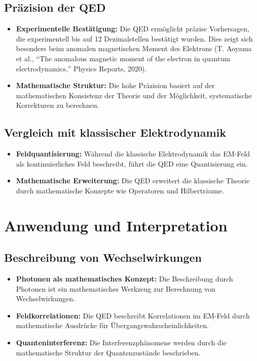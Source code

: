 \documentclass[12pt,a4paper]{article}
\begin{document}
	\subsection{Präzision der QED}
	\begin{itemize}
		\item \textbf{Experimentelle Bestätigung:} Die QED ermöglicht präzise Vorhersagen, die experimentell bis auf 12 Dezimalstellen bestätigt wurden. Dies zeigt sich besonders beim anomalen magnetischen Moment des Elektrons (T. Aoyama et al., ``The anomalous magnetic moment of the electron in quantum electrodynamics,'' Physics Reports, 2020).
		\item \textbf{Mathematische Struktur:} Die hohe Präzision basiert auf der mathematischen Konsistenz der Theorie und der Möglichkeit, systematische Korrekturen zu berechnen.
	\end{itemize}
	
	\subsection{Vergleich mit klassischer Elektrodynamik}
	\begin{itemize}
		\item \textbf{Feldquantisierung:} Während die klassische Elektrodynamik das EM-Feld als kontinuierliches Feld beschreibt, führt die QED eine Quantisierung ein.
		\item \textbf{Mathematische Erweiterung:} Die QED erweitert die klassische Theorie durch mathematische Konzepte wie Operatoren und Hilberträume.
	\end{itemize}
	
	\section{Anwendung und Interpretation}
	\subsection{Beschreibung von Wechselwirkungen}
	\begin{itemize}
		\item \textbf{Photonen als mathematisches Konzept:} Die Beschreibung durch Photonen ist ein mathematisches Werkzeug zur Berechnung von Wechselwirkungen.
		\item \textbf{Feldkorrelationen:} Die QED beschreibt Korrelationen im EM-Feld durch mathematische Ausdrücke für Übergangswahrscheinlichkeiten.
		\item \textbf{Quanteninterferenz:} Die Interferenzphänomene werden durch die mathematische Struktur der Quantenzustände beschrieben.
	\end{itemize}
	
\end{document}
